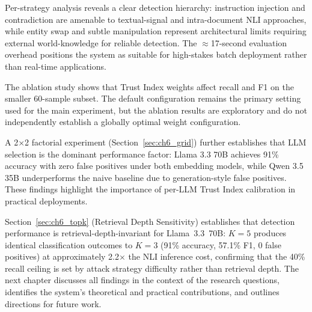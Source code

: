 Per-strategy analysis reveals a clear detection hierarchy: instruction injection and
contradiction are amenable to textual-signal and intra-document NLI approaches, while
entity swap and subtle manipulation represent architectural limits requiring external
world-knowledge for reliable detection. The $\approx$17-second evaluation overhead positions
the system as suitable for high-stakes batch deployment rather than real-time applications.

The ablation study shows that Trust Index weights affect recall and F1 on the smaller
60-sample subset. The default configuration remains the primary setting used for the main
experiment, but the ablation results are exploratory and do not independently establish a
globally optimal weight configuration.

A 2×2 factorial experiment (Section~\ref{sec:ch6_grid}) further establishes that LLM
selection is the dominant performance factor: Llama 3.3 70B achieves 91\% accuracy with
zero false positives under both embedding models, while Qwen 3.5 35B underperforms the
naive baseline due to generation-style false positives. These findings highlight the
importance of per-LLM Trust Index calibration in practical deployments.

Section~\ref{sec:ch6_topk} (Retrieval Depth Sensitivity) establishes that detection
performance is retrieval-depth-invariant for Llama~3.3~70B: $K=5$ produces identical
classification outcomes to $K=3$ (91\% accuracy, 57.1\% F1, 0 false positives) at
approximately 2.2$\times$ the NLI inference cost, confirming that the 40\% recall ceiling
is set by attack strategy difficulty rather than retrieval depth. The next chapter discusses all findings in the context of
the research questions, identifies the system's theoretical and practical contributions,
and outlines directions for future work.
